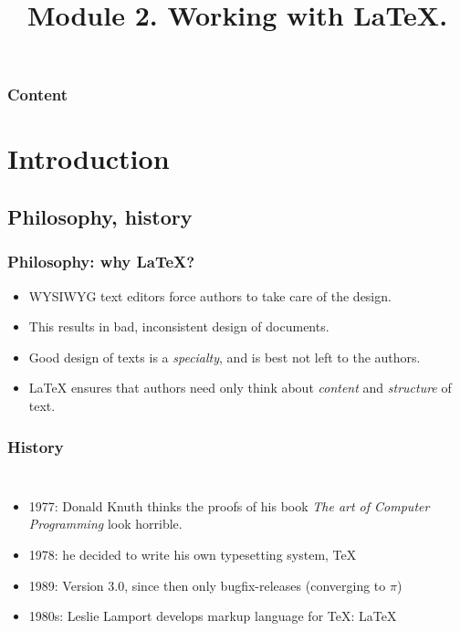 \documentclass[aspectratio=169]{beamer}
\title{Module 2. Working with \LaTeX.}
\subtitle{\coursename}
\author{\lecturers}   %
\date{\academicyear}
\begin{document}
\begin{frame}
  \maketitle
\end{frame}

\begin{frame}
  \frametitle{Content}

  \tableofcontents
\end{frame}

\section{Introduction}

\subsection{Philosophy, history}

\begin{frame}
  \frametitle{Philosophy: why {\LaTeX}?}

  \begin{itemize}
    \item<+-> WYSIWYG text editors force authors to take care of the design.
    \item<+-> This results in bad, inconsistent design of documents.
    \item<+-> Good design of texts is a \textit{specialty}, and is best not left to the authors.
    \item<+-> {\LaTeX} ensures that authors need only think about \textit{content} and \textit{structure} of text.
  \end{itemize}
\end{frame}

\begin{frame}[plain]
  \frametitle{History}

  \begin{columns}[c]

    \begin{itemize}
      \item<+-> 1977: Donald Knuth thinks the proofs of his book \textit{The art of Computer Programming} look horrible.
      \item<+-> 1978: he decided to write his own typesetting system, {\TeX}
      \item<+-> 1989: Version 3.0, since then only bugfix-releases (converging to \(\pi\))
      \item<+-> 1980s: Leslie Lamport develops markup language for {\TeX}: {\LaTeX}
    \end{itemize}

    \begin{center}
    \end{center}

  \end{columns}
\end{frame}
\end{document}
